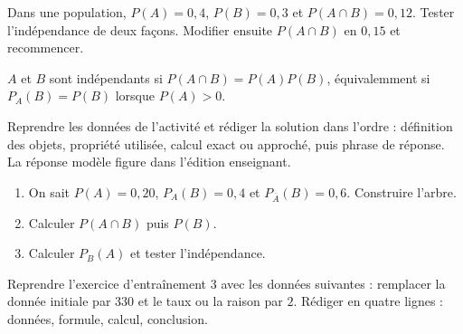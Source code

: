 \begin{activite}
Dans une population, $P(A)=0{,}4$, $P(B)=0{,}3$ et $P(A\cap B)=0{,}12$. Tester l'indépendance de deux façons. Modifier ensuite $P(A\cap B)$ en $0{,}15$ et recommencer.

\end{activite}

\begin{traceecrite}$A$ et $B$ sont indépendants si $P(A\cap B)=P(A)P(B)$, équivalemment si $P_A(B)=P(B)$ lorsque $P(A)>0$.\end{traceecrite}

\begin{exemple}
Reprendre les données de l'activité et rédiger la solution dans l'ordre : définition des objets, propriété utilisée, calcul exact ou approché, puis phrase de réponse. La réponse modèle figure dans l'édition enseignant.
\end{exemple}

\begin{exercice}[-- essentiel]
\begin{enumerate}\item On sait $P(A)=0{,}20$, $P_A(B)=0{,}4$ et $P_{\overline A}(B)=0{,}6$. Construire l'arbre.\item Calculer $P(A\cap B)$ puis $P(B)$.\item Calculer $P_B(A)$ et tester l'indépendance.\end{enumerate}
\end{exercice}


\begin{dm}Reprendre l'exercice d'entraînement 3 avec les données suivantes : remplacer la donnée initiale par $330$ et le taux ou la raison par $2$. Rédiger en quatre lignes : données, formule, calcul, conclusion.\end{dm}

